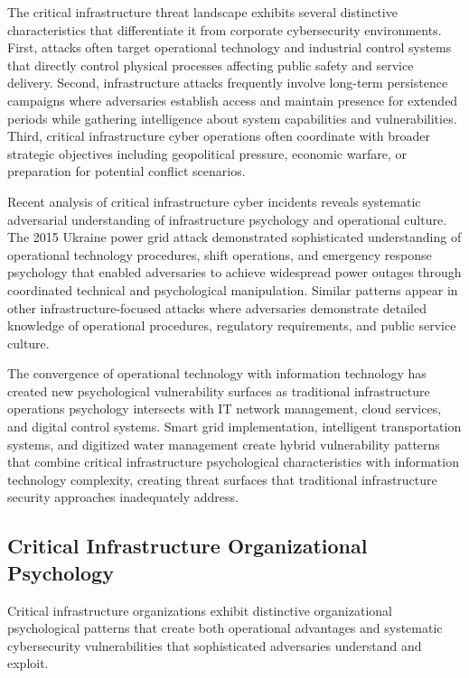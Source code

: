 \documentclass[10pt, twocolumn]{article}
\begin{document}
The critical infrastructure threat landscape exhibits several distinctive characteristics that differentiate it from corporate cybersecurity environments. First, attacks often target operational technology and industrial control systems that directly control physical processes affecting public safety and service delivery. Second, infrastructure attacks frequently involve long-term persistence campaigns where adversaries establish access and maintain presence for extended periods while gathering intelligence about system capabilities and vulnerabilities. Third, critical infrastructure cyber operations often coordinate with broader strategic objectives including geopolitical pressure, economic warfare, or preparation for potential conflict scenarios.

Recent analysis of critical infrastructure cyber incidents reveals systematic adversarial understanding of infrastructure psychology and operational culture. The 2015 Ukraine power grid attack demonstrated sophisticated understanding of operational technology procedures, shift operations, and emergency response psychology that enabled adversaries to achieve widespread power outages through coordinated technical and psychological manipulation. Similar patterns appear in other infrastructure-focused attacks where adversaries demonstrate detailed knowledge of operational procedures, regulatory requirements, and public service culture.

The convergence of operational technology with information technology has created new psychological vulnerability surfaces as traditional infrastructure operations psychology intersects with IT network management, cloud services, and digital control systems. Smart grid implementation, intelligent transportation systems, and digitized water management create hybrid vulnerability patterns that combine critical infrastructure psychological characteristics with information technology complexity, creating threat surfaces that traditional infrastructure security approaches inadequately address.

\subsection{Critical Infrastructure Organizational Psychology}

Critical infrastructure organizations exhibit distinctive organizational psychological patterns that create both operational advantages and systematic cybersecurity vulnerabilities that sophisticated adversaries understand and exploit.
\end{document}
